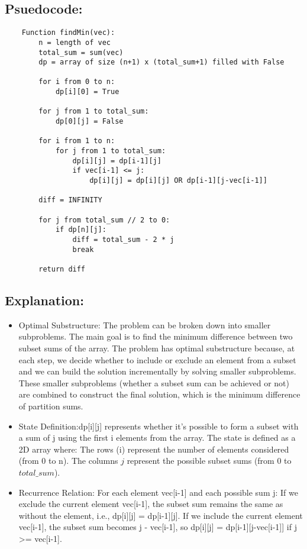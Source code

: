 \documentclass[10pt]{article}
\begin{document}
\subsection{Psuedocode:}
\begin{verbatim}
    Function findMin(vec):
        n = length of vec
        total_sum = sum(vec)
        dp = array of size (n+1) x (total_sum+1) filled with False

        for i from 0 to n:
            dp[i][0] = True

        for j from 1 to total_sum:
            dp[0][j] = False

        for i from 1 to n:
            for j from 1 to total_sum:
                dp[i][j] = dp[i-1][j]
                if vec[i-1] <= j:
                    dp[i][j] = dp[i][j] OR dp[i-1][j-vec[i-1]]

        diff = INFINITY

        for j from total_sum // 2 to 0:
            if dp[n][j]:
                diff = total_sum - 2 * j
                break

        return diff

\end{verbatim}
\subsection{Explanation:}
\begin{itemize}
    \item Optimal Substructure: The problem can be broken down into smaller subproblems. The main goal is to find the minimum difference between two subset sums of the array. The problem has optimal substructure because, at each step, we decide whether to include or exclude an element from a subset and we can build the solution incrementally by solving smaller subproblems. These smaller subproblems (whether a subset sum can be achieved or not) are combined to construct the final solution, which is the minimum difference of partition sums.
\item State Definition:dp[i][j] represents whether it's possible to form a subset with a sum of j using the first i elements from the array.
The state is defined as a 2D array where:
The rows (i) represent the number of elements considered (from 0 to n).
The columns \(j\) represent the possible subset sums (from 0 to \(total\_sum\)).

\item Recurrence Relation: For each element vec[i-1] and each possible sum j:
If we exclude the current element vec[i-1], the subset sum remains the same as without the element, i.e., dp[i][j] = dp[i-1][j].
If we include the current element vec[i-1], the subset sum becomes j - vec[i-1], so dp[i][j] = dp[i-1][j-vec[i-1]] if j >= vec[i-1].
\end{itemize}
\end{document}
